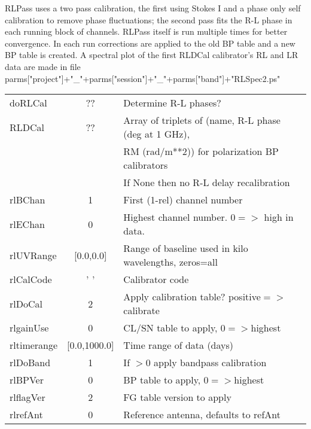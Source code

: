 \documentclass[11pt]{article}
\begin{document}
\begin{enumerate}
RLPass uses a two pass calibration, the first using Stokes I and a
phase only self calibration to remove phase fluctuations; the second
pass fits the R-L phase in each running block of channels.
RLPass itself is run multiple times for better convergence.
In each run corrections are applied to the old BP table and a new BP
table is created. 
A spectral plot of the  first RLDCal calibrator's RL and LR data are made in file\\
parms["project"]+"\_"+parms["session"]+"\_"+parms["band"]+"RLSpec2.ps"\\
\begin{center}
\begin{tabular}{|l|c|l|}
\hline
doRLCal  & ??  & Determine R-L phases? \\
RLDCal   & ??  &  Array of triplets of (name, R-L phase (deg at 1 GHz), \\
 & &  RM (rad/m**2)) for polarization BP calibrators\\
 & &  If None then no R-L delay recalibration \\
rlBChan     & 1            & First (1-rel) channel number\\
rlEChan     & 0            & Highest channel number. $0=>$ high in data. \\
rlUVRange   &  [0.0,0.0]   & Range of baseline used in kilo wavelengths, zeros=all\\
rlCalCode   & '  '         & Calibrator code\\
rlDoCal     & 2            & Apply calibration table? positive$=>$calibrate\\
rlgainUse   & 0            & CL/SN table to apply, $0=>$highest\\
rltimerange & [0.0,1000.0] & Time range of data (days)\\
rlDoBand    & 1            & If $> 0$ apply bandpass calibration \\
rlBPVer     & 0            & BP table to apply, $0=>$highest\\
rlflagVer   & 2            & FG table version to apply \\
rlrefAnt    & 0            & Reference antenna, defaults to refAnt\\

\end{tabular}
\end{center}
\end{enumerate}
\end{document}
